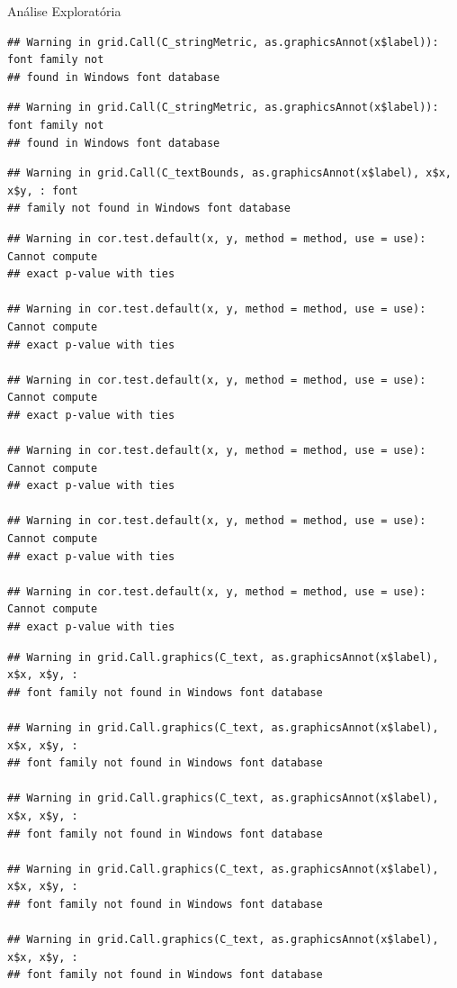 \documentclass[
  9 pt,
  ignorenonframetext,
]{beamer}
\begin{document}
\begin{frame}[fragile]{Análise Exploratória}
\begin{verbatim}
## Warning in grid.Call(C_stringMetric, as.graphicsAnnot(x$label)): font family not
## found in Windows font database
\end{verbatim}

\begin{verbatim}
## Warning in grid.Call(C_stringMetric, as.graphicsAnnot(x$label)): font family not
## found in Windows font database
\end{verbatim}

\begin{verbatim}
## Warning in grid.Call(C_textBounds, as.graphicsAnnot(x$label), x$x, x$y, : font
## family not found in Windows font database
\end{verbatim}

\begin{verbatim}
## Warning in cor.test.default(x, y, method = method, use = use): Cannot compute
## exact p-value with ties

## Warning in cor.test.default(x, y, method = method, use = use): Cannot compute
## exact p-value with ties

## Warning in cor.test.default(x, y, method = method, use = use): Cannot compute
## exact p-value with ties

## Warning in cor.test.default(x, y, method = method, use = use): Cannot compute
## exact p-value with ties

## Warning in cor.test.default(x, y, method = method, use = use): Cannot compute
## exact p-value with ties

## Warning in cor.test.default(x, y, method = method, use = use): Cannot compute
## exact p-value with ties
\end{verbatim}

\begin{verbatim}
## Warning in grid.Call.graphics(C_text, as.graphicsAnnot(x$label), x$x, x$y, :
## font family not found in Windows font database

## Warning in grid.Call.graphics(C_text, as.graphicsAnnot(x$label), x$x, x$y, :
## font family not found in Windows font database

## Warning in grid.Call.graphics(C_text, as.graphicsAnnot(x$label), x$x, x$y, :
## font family not found in Windows font database

## Warning in grid.Call.graphics(C_text, as.graphicsAnnot(x$label), x$x, x$y, :
## font family not found in Windows font database

## Warning in grid.Call.graphics(C_text, as.graphicsAnnot(x$label), x$x, x$y, :
## font family not found in Windows font database


\end{verbatim}
\end{frame}
\end{document}
